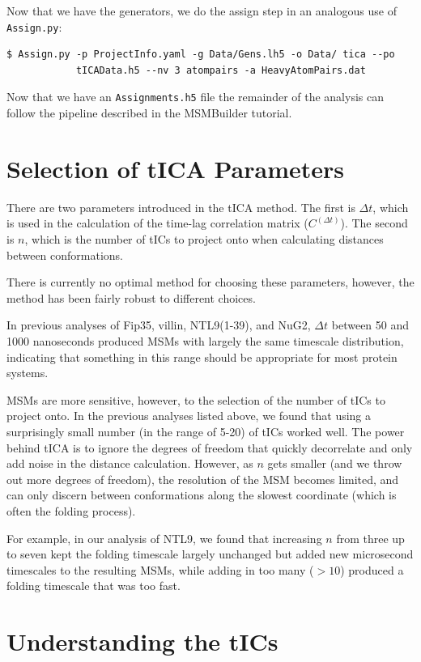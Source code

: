 \documentclass[12pt]{article}
\begin{document}
Now that we have the generators, we do the assign step in an analogous use of \texttt{Assign.py}:
\begin{verbatim}
$ Assign.py -p ProjectInfo.yaml -g Data/Gens.lh5 -o Data/ tica --po 
            tICAData.h5 --nv 3 atompairs -a HeavyAtomPairs.dat
\end{verbatim} 

Now that we have an \texttt{Assignments.h5} file the remainder of the analysis can follow the pipeline described in the MSMBuilder tutorial.

\section{Selection of tICA Parameters}

There are two parameters introduced in the tICA method. The first is $\Delta t$, which is used in the calculation of the time-lag correlation matrix ($C^{(\Delta t)}$). The second is $n$, which is the number of tICs to project onto when calculating distances between conformations. 

There is currently no optimal method for choosing these parameters, however, the method has been fairly robust to different choices. 

In previous analyses of Fip35, villin, NTL9(1-39), and NuG2, $\Delta t$ between 50 and 1000 nanoseconds produced MSMs with largely the same timescale distribution, indicating that something in this range should be appropriate for most protein systems.

MSMs are more sensitive, however, to the selection of the number of tICs to project onto. In the previous analyses listed above, we found that using a surprisingly small number (in the range of 5-20) of tICs worked well. The power behind tICA is to ignore the degrees of freedom that quickly decorrelate and only add noise in the distance calculation. However, as $n$ gets smaller (and we throw out more degrees of freedom), the resolution of the MSM becomes limited, and can only discern between conformations along the slowest coordinate (which is often the folding process). 

For example, in our analysis of NTL9, we found that increasing $n$ from three up to seven kept the folding timescale largely unchanged but added new microsecond timescales to the resulting MSMs, while adding in too many ($> 10$) produced a folding timescale that was too fast.

\section{Understanding the tICs}
\end{document}

